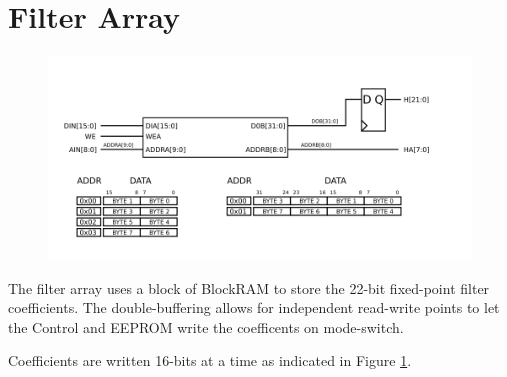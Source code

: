 \section{Filter Array}

\begin{figure}
\label{filterarray}
\includegraphics[scale=1.0]{filterarray.svg}
\end{figure}

The filter array uses a block of BlockRAM to store the 22-bit
fixed-point filter coefficients. The double-buffering allows for
independent read-write points to let the Control and EEPROM write the
coefficents on mode-switch.

Coefficients are written 16-bits at a time as indicated in Figure \ref{filterarray}. 

